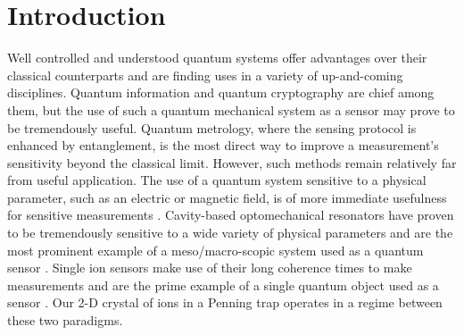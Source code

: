 \documentclass[aps,prl,twocolumn,groupedaddress,floatfix]{revtex4-1}
\begin{document}


\section{Introduction}
Well controlled and understood quantum systems offer advantages over their classical counterparts and are finding uses in a variety of up-and-coming disciplines. Quantum information and quantum cryptography are chief among them, but the use of such a quantum mechanical system as a sensor may prove to be tremendously useful. Quantum metrology, where the sensing protocol is enhanced by entanglement, is the most direct way to improve a measurement's sensitivity beyond the classical limit. However, such methods remain relatively far from useful application. The use of a quantum system sensitive to a physical parameter, such as an electric or magnetic field, is of more immediate usefulness for sensitive measurements \citep{Degen2016}. Cavity-based optomechanical resonators have proven to be tremendously sensitive to a wide variety of physical parameters and are the most prominent example of a meso/macro-scopic system used as a quantum sensor \citep{Clark2016,Kampel2016,Kim2016a,Schreppler2014a}. Single ion sensors make use of their long coherence times to make measurements and are the prime example of a single quantum object used as a sensor \citep{Shaniv2016,Ivanov2016a,Knunz2010}. Our 2-D crystal of ions in a Penning trap operates in a regime between these two paradigms.
 
\end{document}
